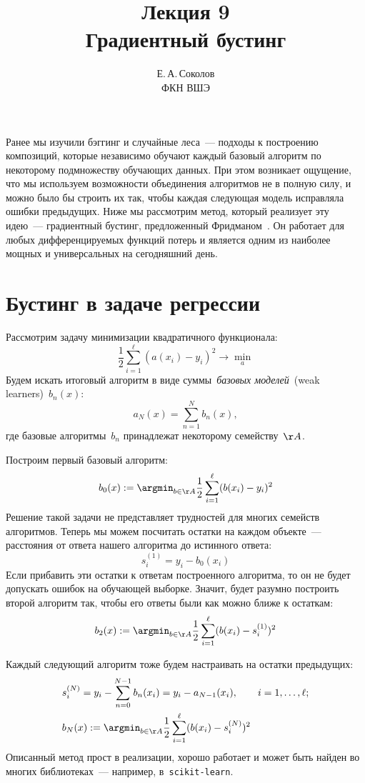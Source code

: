 \documentclass[12pt,fleqn]{article}
\begin{document}
\title{Лекция 9\\Градиентный бустинг}
\author{Е.\,А.\,Соколов\\ФКН ВШЭ}
\maketitle

Ранее мы изучили бэггинг и случайные леса~--- подходы к построению композиций, которые
независимо обучают каждый базовый алгоритм по некоторому подмножеству обучающих данных.
При этом возникает ощущение, что мы используем возможности объединения алгоритмов
не в полную силу, и можно было бы строить их так, чтобы каждая следующая модель
исправляла ошибки предыдущих.
Ниже мы рассмотрим метод, который реализует эту идею~--- градиентный бустинг,
предложенный Фридманом~\cite{friedman01gbm}.
Он работает для любых дифференцируемых функций потерь и является одним из наиболее
мощных и универсальных на сегодняшний день.

\section{Бустинг в задаче регрессии}\label{section:regBoost}
Рассмотрим задачу минимизации квадратичного функционала:
\[
    \frac12
    \sum_{i = 1}^{\ell}
        (a(x_i) - y_i)^2
    \to
    \min_{a}
\]
Будем искать итоговый алгоритм в виде суммы~\emph{базовых моделей}~(weak learners)~$b_n(x)$:
\[
    a_N(x)
    =
    \sum_{n = 1}^{N}
        b_n(x),
\]
где базовые алгоритмы~$b_n$ принадлежат некоторому семейству~$\AA$.

Построим первый базовый алгоритм:
\[
    b_0(x)
    :=
    \argmin_{b \in \AA}
        \frac12
        \sum_{i = 1}^{\ell}
            (b(x_i) - y_i)^2
\]
Решение такой задачи не представляет трудностей для многих семейств алгоритмов.
Теперь мы можем посчитать остатки на каждом объекте~--- расстояния от ответа
нашего алгоритма до истинного ответа:
\[
    s_i^{(1)} = y_i - b_0(x_i)
\]
Если прибавить эти остатки к ответам построенного алгоритма, то он не будет допускать
ошибок на обучающей выборке.
Значит, будет разумно построить второй алгоритм так, чтобы его ответы
были как можно ближе к остаткам:
\[
    b_2(x)
    :=
    \argmin_{b \in \AA}
        \frac12
        \sum_{i = 1}^{\ell}
            (b(x_i) - s_i^{(1)})^2
\]

Каждый следующий алгоритм тоже будем настраивать на остатки предыдущих:
\begin{align*}
    &s_i^{(N)}
    =
    y_i - \sum_{n = 0}^{N - 1} b_n(x_i)
    =
    y_i
    -
    a_{N - 1}(x_i),
    \qquad
    i = 1, \dots, \ell;\\
    &b_N(x)
    :=
    \argmin_{b \in \AA}
        \frac12
        \sum_{i = 1}^{\ell}
            (b(x_i) - s_i^{(N)})^2
\end{align*}
Описанный метод прост в реализации,
хорошо работает и может быть найден во многих библиотеках~---
например, в~\texttt{scikit-learn}.
\end{document}
